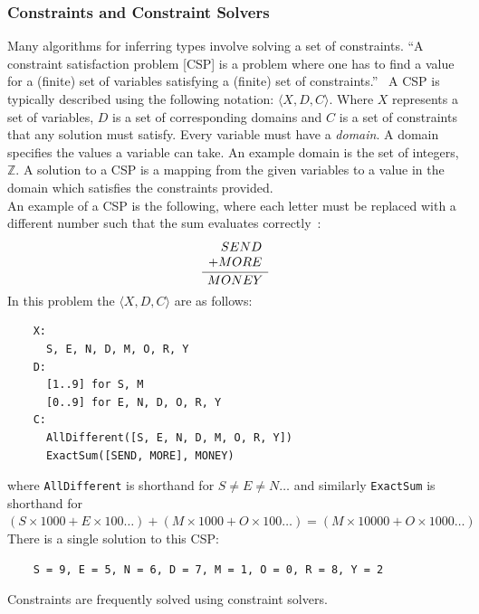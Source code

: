 \documentclass[12pt, titlepage]{article}
\begin{document}
\subsubsection{Constraints and Constraint Solvers}
Many algorithms for inferring types involve solving a set of constraints. ``A constraint satisfaction problem [CSP] is a problem where one has to find a value for a (finite) set of variables satisfying a (finite) set of constraints.''~\cite{constraintBook} A CSP is typically described using the following notation: $\langle X, D, C \rangle$. Where $X$ represents a set of variables, $D$ is a set of corresponding domains and $C$ is a set of constraints that any solution must satisfy. Every variable must have a \textit{domain}. A domain specifies the values a variable can take. An example domain is the set of integers, $\mathbb{Z}$. A solution to a CSP is a mapping from the given variables to a value in the domain which satisfies the constraints provided. \\
An example of a CSP is the following, where each letter must be replaced with a different number such that the sum evaluates correctly~\cite{constraintPrinciples}: \\
\begin{equation*}
\frac{
    \begin{array}[b]{r}
      SEND \\
      + MORE
    \end{array}
  }{
    MONEY
  }
\end{equation*}
In this problem the  $\langle X, D, C \rangle$ are as follows:
\begin{verbatim}
    X:
      S, E, N, D, M, O, R, Y 
    D:
      [1..9] for S, M
      [0..9] for E, N, D, O, R, Y
    C:
      AllDifferent([S, E, N, D, M, O, R, Y])
      ExactSum([SEND, MORE], MONEY)
\end{verbatim}
where \texttt{AllDifferent} is shorthand for $S \neq E \neq N \ldots$ and similarly \texttt{ExactSum} is shorthand for $(S \times 1000 + E \times 100 \ldots)  + (M \times 1000 + O \times 100 \ldots) = (M \times 10000 + O \times 1000 \ldots) $ \\
\indent There is a single solution to this CSP:
\begin{verbatim}
    S = 9, E = 5, N = 6, D = 7, M = 1, O = 0, R = 8, Y = 2
\end{verbatim}
Constraints are frequently solved using constraint solvers. %
\end{document}
